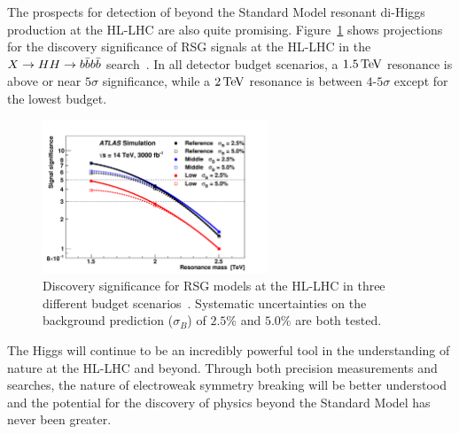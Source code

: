 The prospects for detection of beyond the Standard Model resonant di-Higgs production at the HL-LHC are also quite promising. Figure~\ref{fig:HH_prospect} shows projections for the discovery significance of RSG signals at the HL-LHC in the $X\to HH \to b\bar{b}b\bar{b}$ search~\cite{ScopingDocument}. In all detector budget scenarios, a $1.5 \TeV$ resonance is above or near $5\sigma$ significance, while a $2 \TeV$ resonance is between $4$-$5\sigma$ except for the lowest budget. 
%
\begin{figure}[h!]
  \centering
  \captionsetup{justification=centering}

  \includegraphics[width=0.6\textwidth]{figures/HH_scoping}
        
   \caption{Discovery significance for RSG models at the HL-LHC in three different budget scenarios~\cite{ScopingDocument}. Systematic uncertainties on the background prediction ($\sigma_B$) of $2.5\%$ and $5.0\%$ are both tested.}
  \label{fig:HH_prospect}
\end{figure}
%

The Higgs will continue to be an incredibly powerful tool in the understanding of nature at the HL-LHC and beyond. Through both precision measurements and searches, the nature of electroweak symmetry breaking will be better understood and the potential for the discovery of physics beyond the Standard Model has never been greater. 



